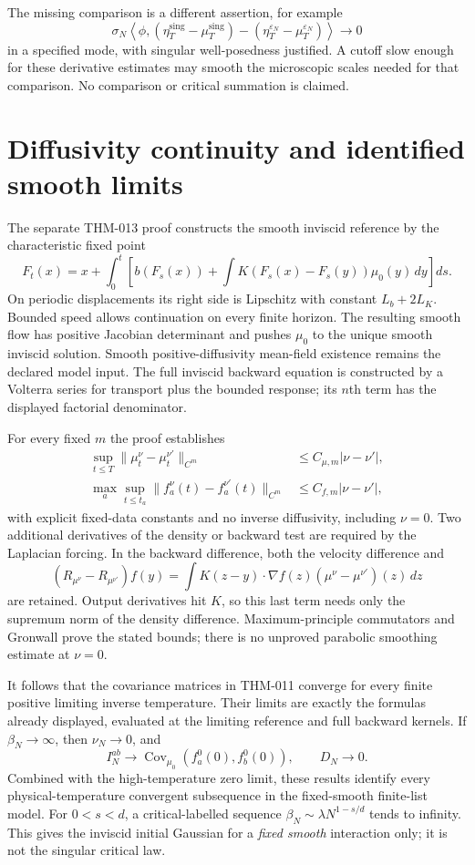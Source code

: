 \documentclass[11pt]{article}
\begin{document}
The missing comparison is a different assertion, for example
\[
 \sigma_N\left\langle\phi,
  (\eta_T^{\mathrm{sing}}-\mu_T^{\mathrm{sing}})
  -(\eta_T^{\varepsilon_N}-\mu_T^{\varepsilon_N})\right\rangle
          \longrightarrow0
\]
in a specified mode, with singular well-posedness justified. A cutoff slow
enough for these derivative estimates may smooth the microscopic scales
needed for that comparison. No comparison or critical summation is claimed.

\section{Diffusivity continuity and identified smooth limits}
The separate THM-013 proof constructs the smooth inviscid reference by the
characteristic fixed point
\[
 F_t(x)=x+\int_0^t\left[b(F_s(x))+
       \int K(F_s(x)-F_s(y))\mu_0(y)\,dy\right]ds.
\]
On periodic displacements its right side is Lipschitz with constant
$L_b+2L_K$. Bounded speed allows continuation on every finite horizon.
The resulting smooth flow has positive Jacobian determinant and pushes
$\mu_0$ to the unique smooth inviscid solution. Smooth positive-diffusivity
mean-field existence remains the declared model input. The full inviscid
backward equation is constructed by a Volterra series for transport plus
the bounded response; its $n$th term has the displayed factorial denominator.

For every fixed $m$ the proof establishes
\begin{align*}
 \sup_{t\le T}\|\mu_t^\nu-\mu_t^{\nu'}\|_{C^m}
       &\le C_{\mu,m}|\nu-\nu'|,\\
 \max_a\sup_{t\le t_a}\|f_a^\nu(t)-f_a^{\nu'}(t)\|_{C^m}
       &\le C_{f,m}|\nu-\nu'|,
\end{align*}
with explicit fixed-data constants and no inverse diffusivity, including
$\nu=0$. Two additional derivatives of the density or backward test are
required by the Laplacian forcing. In the backward difference, both the
velocity difference and
\[
 (R_{\mu^\nu}-R_{\mu^{\nu'}})f(y)
     =\int K(z-y)\cdot\nabla f(z)
                    (\mu^\nu-\mu^{\nu'})(z)\,dz
\]
are retained. Output derivatives hit $K$, so this last term needs only the
supremum norm of the density difference. Maximum-principle commutators and
Gronwall prove the stated bounds; there is no unproved parabolic smoothing
estimate at $\nu=0$.

It follows that the covariance matrices in THM-011 converge for every finite
positive limiting inverse temperature. Their limits are exactly the formulas
already displayed, evaluated at the limiting reference and full backward
kernels. If $\beta_N\to\infty$, then $\nu_N\to0$, and
\[
 I_N^{ab}\longrightarrow
       \operatorname{Cov}_{\mu_0}(f_a^0(0),f_b^0(0)),
 \qquad D_N\longrightarrow0.
\]
Combined with the high-temperature zero limit, these results identify every
physical-temperature convergent subsequence in the fixed-smooth finite-list
model. For $0<s<d$, a critical-labelled sequence
$\beta_N\sim\lambda N^{1-s/d}$ tends to infinity. This gives the inviscid
initial Gaussian for a \emph{fixed smooth} interaction only; it is not the
singular critical law.
\end{document}
